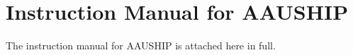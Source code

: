 \chapter{Instruction Manual for AAUSHIP}
The instruction manual for AAUSHIP is attached here in full.

